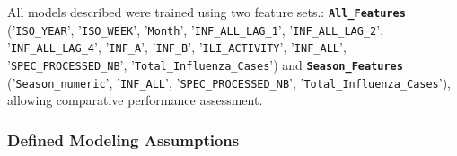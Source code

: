 All models described were trained using two feature sets.: \textbf{\texttt{All\_Features}} ('\texttt{ISO\_YEAR}', '\texttt{ISO\_WEEK}', '\texttt{Month}', '\texttt{INF\_ALL\_LAG\_1}', '\texttt{INF\_ALL\_LAG\_2}', '\texttt{INF\_ALL\_LAG\_4}', '\texttt{INF\_A}', '\texttt{INF\_B}', '\texttt{ILI\_ACTIVITY}', '\texttt{INF\_ALL}', '\texttt{SPEC\_PROCESSED\_NB}', '\texttt{Total\_Influenza\_Cases}') and \textbf{\texttt{Season\_Features}} ('\texttt{Season\_numeric}', '\texttt{INF\_ALL}', '\texttt{SPEC\_PROCESSED\_NB}', '\texttt{Total\_Influenza\_Cases}'), allowing comparative performance assessment.

\subsubsection*{Defined Modeling Assumptions}

